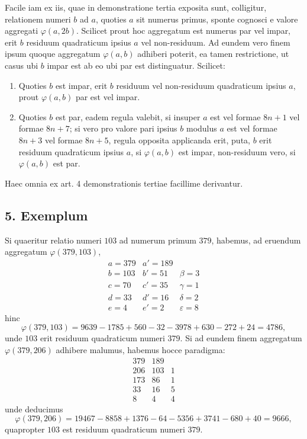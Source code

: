 \documentclass[12pt]{article}
\begin{document}
Facile iam ex iis, quae in demonstratione tertia exposita sunt, colligitur, relationem numeri $b$ ad $a$, quoties $a$ sit numerus primus, sponte cognosci e valore aggregati $\varphi(a,2b)$. Scilicet prout hoc aggregatum est numerus par vel impar, erit $b$ residuum quadraticum ipsius $a$ vel non-residuum. Ad eundem vero finem ipsum quoque aggregatum $\varphi(a,b)$ adhiberi poterit, ea tamen restrictione, ut casus ubi $b$ impar est ab eo ubi par est distinguatur. Scilicet:
\begin{enumerate}[label=\Roman*.]
\item Quoties $b$ est impar, erit $b$ residuum vel non-residuum quadraticum ipsius $a$, prout $\varphi(a,b)$ par est vel impar.
\item Quoties $b$ est par, eadem regula valebit, si insuper $a$ est vel formae $8n+1$ vel formae $8n+7$; si vero pro valore pari ipsius $b$ modulus $a$ est vel formae $8n+3$ vel formae $8n+5$, regula opposita applicanda erit, puta, $b$ erit residuum quadraticum ipsius $a$, si $\varphi(a,b)$ est impar, non-residuum vero, si $\varphi(a,b)$ est par.
\end{enumerate}
Haec omnia ex art. 4 demonstrationis tertiae facillime derivantur.

\subsection*{5. Exemplum}

Si quaeritur relatio numeri $103$ ad numerum primum $379$, habemus, ad eruendum aggregatum $\varphi(379,103)$,
\[
\begin{array}{r|r|r}
a=379&a'=189&\\
b=103&b'=51&\beta=3\\
c=70&c'=35&\gamma=1\\
d=33&d'=16&\delta=2\\
e=4&e'=2&\varepsilon=8
\end{array}
\]
hinc
\[
\varphi(379,103)=9639-1785+560-32-3978+630-272+24=4786,
\]
unde $103$ erit residuum quadraticum numeri $379$. Si ad eundem finem aggregatum $\varphi(379,206)$ adhibere malumus, habemus hocce paradigma:
\[
\begin{array}{r|r|r}
379&189&\\
206&103&1\\
173&86&1\\
33&16&5\\
8&4&4
\end{array}
\]
unde deducimus
\[
\varphi(379,206)=19467-8858+1376-64-5356+3741-680+40=9666,
\]
quapropter $103$ est residuum quadraticum numeri $379$.
\end{document}
